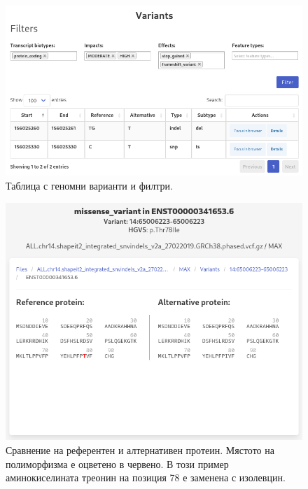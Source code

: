 \documentclass[pdftex,cyrillic,14pt,a4page,twoside,openright]{extreport}
\begin{document}
\begin{figure}[ht]
  \centering
  \includegraphics[width=16cm]{figures/variants_list}
  \caption {Таблица с геномни варианти и филтри.}
  \label{fig:variants_list}
\end{figure}

\begin{figure}[ht]
  \centering
  \includegraphics[width=16cm]{figures/protein_comparison}
  \caption {Сравнение на референтен и алтернативен протеин. Мястото на полиморфизма е оцветено в червено. В този пример аминокиселината треонин на позиция 78 е заменена с изолевцин.}
  \label{fig:protein_comparison}
\end{figure}
\end{document}
